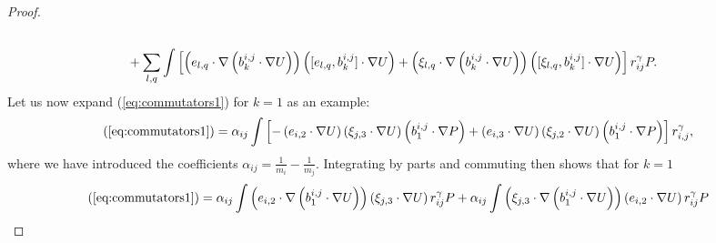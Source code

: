 \documentclass[10pt,oneside]{amsart}
\numberwithin{equation}{section}
\numberwithin{definition}{section}
\numberwithin{theorem}{section}
\numberwithin{lemma}{section}
\begin{document}
\begin{proof}
\begin{align}
    \raisetag{-6mm}\label{eq:commutators2}\\
    & +\sum_{l,q}\int\left[\left(e_{l,q}\cdot\nabla\left(b_{k}^{i,j}\cdot\nabla U\right)\right)\left([e_{l,q},b_{k}^{i,j}]\cdot\nabla U\right)+\left(\xi_{l,q}\cdot\nabla\left(b_{k}^{i,j}\cdot\nabla U\right)\right)\left([\xi_{l,q},b_{k}^{i,j}]\cdot\nabla U\right)\right]r_{ij}^{\gamma}P
    \raisetag{-6mm}\label{eq:commutators3}.
  \end{align} 
  Let us now expand (\ref{eq:commutators1}) for $k=1$ as an example:
  \begin{equation*}
    (\ref{eq:commutators1})=\alpha_{ij}\int\left[-\left(e_{i,2}\cdot\nabla U\right)\left(\xi_{j,3}\cdot\nabla U\right)\left(b_{1}^{i,j}\cdot\nabla P\right)+\left(e_{i,3}\cdot\nabla U\right)\left(\xi_{j,2}\cdot\nabla U\right)\left(b_{1}^{i,j}\cdot\nabla P\right)\right]r_{i,j}^{\gamma},
  \end{equation*}
  where we have introduced the coefficients $\alpha_{ij} = \frac{1}{m_{i}}-\frac{1}{m_{j}}$. Integrating by parts and commuting then shows that for $k=1$
  \begin{align*}
    (\ref{eq:commutators1}) & =  \alpha_{ij}\int\left(e_{i,2}\cdot\nabla\left(b_{1}^{i,j}\cdot\nabla U\right)\right)\left(\xi_{j,3}\cdot\nabla U\right)r_{ij}^{\gamma}P
    +\alpha_{ij}\int\left(\xi_{j,3}\cdot\nabla\left(b_{1}^{i,j}\cdot\nabla U\right)\right)\left(e_{i,2}\cdot\nabla U\right)r_{ij}^{\gamma}P	\\

\end{align*}
\end{proof}
\end{document}
